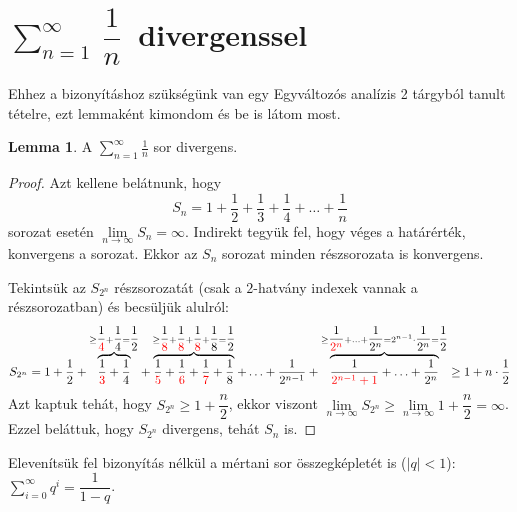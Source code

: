 \documentclass[12pt]{book}
\theoremstyle{plain} %
\theoremstyle{definition} %
\newtheorem{lem/}{Lemma}[section]
\newenvironment{lem}
  {\renewcommand{\qedsymbol}{$\clubsuit$}%
   \pushQED{\qed}\begin{lem/}}
  {\popQED\end{lem/}}
\theoremstyle{remark}
\renewcommand\qedsymbol{$\blacksquare$}
\numberwithin{equation}{section}  %
\begin{document}
	\section{$\displaystyle\sum_{n=1}^{\infty} \ \dfrac{1}{n}\ $ divergenssel}
	
	Ehhez a bizonyításhoz szükségünk van egy Egyváltozós analízis 2 tárgyból tanult tételre, ezt lemmaként kimondom és be is látom most.
	
	\begin{lem}\label{egypern}
		A $\sum\limits_{n=1}^{\infty} \frac{1}{n}$ sor divergens.
	\end{lem}

	\begin{proof}
		Azt kellene belátnunk, hogy
		\[ S_n = 1 + \dfrac{1}{2} + \dfrac{1}{3} + \dfrac{1}{4} + \ldots + \dfrac{1}{n} \]
		sorozat esetén $\lim\limits_{n\to \infty} S_n = \infty$. Indirekt tegyük fel, hogy véges a határérték, konvergens a sorozat. Ekkor az $S_n$ sorozat minden részsorozata is konvergens.
		
		Tekintsük az $S_{2^n}$ részsorozatát (csak a $2$-hatvány indexek vannak a részsorozatban) és becsüljük alulról:
		\[ S_{2^n} = 1 + \dfrac{1}{2} + \overbrace{ \dfrac{1}{\color{red}3} +\dfrac{1}{4} }^{\geq \dfrac{1}{\color{red}4}+\dfrac{1}{4} = \dfrac{1}{2}} +\overbrace{ \dfrac{1}{\color{red}5}+\dfrac{1}{\color{red}6}+\dfrac{1}{\color{red}7}+\dfrac{1}{8}}^{\geq \dfrac{1}{\color{red}8}+\dfrac{1}{\color{red}8}+\dfrac{1}{\color{red}8}+\dfrac{1}{8} = \dfrac{1}{2}} +\ldots + \dfrac{1}{2^{n-1}} + \overbrace{ \dfrac{1}{\color{red}2^{n-1}+1} + \ldots + \dfrac{1}{2^n} }^{\geq \dfrac{1}{\color{red}2^n} + \ldots + \dfrac{1}{2^n} = 2^{n-1} \cdot \dfrac{1}{2^n} = \dfrac{1}{2}} \geq 1 + n\cdot \dfrac{1}{2} \]
		Azt kaptuk tehát, hogy $S_{2^n}\geq 1+\dfrac{n}{2}$, ekkor viszont $\lim\limits_{n\to \infty} S_{2^n} \geq \lim\limits_{n\to \infty} 1+\dfrac{n}{2} = \infty$. Ezzel beláttuk, hogy $S_{2^n}$ divergens, tehát $S_n$ is.
	\end{proof}

	Elevenítsük fel bizonyítás nélkül a mértani sor összegképletét is ($|q|<1$): $\sum\limits_{i=0}^{\infty} q^i = \dfrac{1}{1-q}$.
\end{document}
